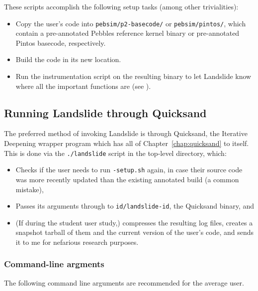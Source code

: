These scripts accomplish the following setup tasks (among other trivialities):
\begin{itemize}
	\item Copy the user's code into {\tt pebsim/p2-basecode/} or {\tt pebsim/pintos/},
		which contain a pre-annotated Pebbles reference kernel binary or pre-annotated Pintos basecode, respectively.
	\item Build the code in its new location.
	\item Run the instrumentation script on the resulting binary to let Landslide know where all the important functions are
		(see \sect{\ref{sec:landslide-glue}}).
\end{itemize}

\subsection{Running Landslide through Quicksand}

The preferred method of invoking Landslide is through Quicksand, the Iterative Deepening wrapper program which has all of Chapter~\ref{chap:quicksand} to itself.
This is done via the {\tt ./landslide} script in the top-level directory, which:
\begin{itemize}
	\item Checks if the user needs to run {\tt *-setup.sh} again, in case their source code was more recently updated than the existing annotated build (a common mistake),
	\item Passes its arguments through to {\tt id/landslide-id}, the Quicksand binary,
		and
	\item (If during the student user study,) compresses the resulting log files,
		creates a snapshot tarball of them and the current version of the user's code,
		and sends it to me for nefarious research purposes.
\end{itemize}

\subsubsection{Command-line argments}

The following command line arguments are recommended for the average user.

